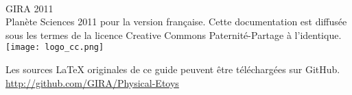\documentclass[a4paper,12pt]{article}
\begin{document}
\clearpage
\thispagestyle{empty}
~
\vfill
\begin{center}
        GIRA 2011\\
        Planète Sciences 2011 pour la version française.
        Cette documentation est diffusée sous les termes de la licence Creative Commons Paternité-Partage à l'identique.\\
        \vspace{2cm}
        \texttt{[image: logo\_cc.png]}
\end{center}

\vfill

\begin{center}
        Les sources LaTeX originales de ce guide peuvent être téléchargées sur GitHub.
        \url{http://github.com/GIRA/Physical-Etoys}
\end{center}

\vfill
\end{document}
